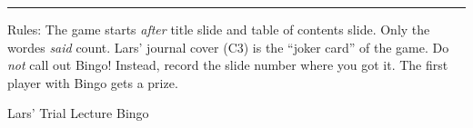 \documentclass[a4paper, twocolumn]{article}
\newcommand{\randomwordss}{%
Data; Filter; Compression; MRI; Monte carlo; Sensitivity; Gaussian; Bayes(ian); Image; Brain;
Statistics; Multilevel; Concentration; Diffusion; Coefficient; PDE; Constraint; Optimization; Glymphatic; Matrix;
Noise; Cancer; AI; Probability; Mean; Prediction; Model; Robust; Convergence; Fusion;
Likelihood; Peak; Intensity; Inverse; Reduced; Deep; Network; Registration; Label; Benign;
Plot; Article; Paper; Paraview; Dementia; Mesh; Regular; Smooth; Tangent; Control
}
\begin{document}
\hrule
\vspace{2pt}
   \footnotesize{
     Rules: The game starts \emph{after} title slide and table of contents 
     slide. Only the wordes \emph{said} count. Lars' journal cover (C3) is
     the ``joker card'' of the game. Do \emph{not} call
     out Bingo! Instead, record the slide number where you got it. The first
     player with Bingo gets a prize.
   }

\newpage

\begin{center}\Large{
    Lars' Trial Lecture Bingo
}\end{center}

\begin{figure}[h!]
  \begin{center}
\end{center}
\end{figure}
\end{document}
